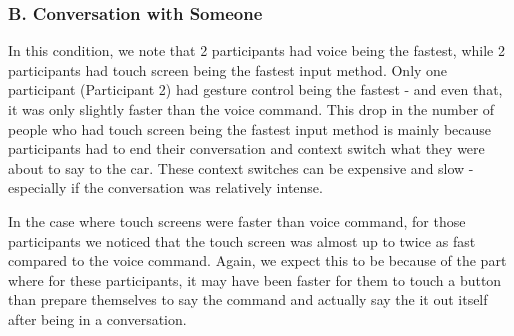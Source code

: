 \documentclass{sigchi}
\begin{document}
\subsubsection{B. Conversation with Someone}

\begin{table}[H] %
\centering
\caption{Times taken, in seconds, by each participant for each input method, when in a conversation with someone when a request to intervene was issued}
\label{table:timeConversation}
\end{table}

In this condition, we note that 2 participants had voice being the fastest, while 2 participants had touch screen being the fastest input method. Only one participant (Participant 2) had gesture control being the fastest - and even that, it was only slightly faster than the voice command. This drop in the number of people who had touch screen being the fastest input method is mainly because participants had to end their conversation and context switch what they were about to say to the car. These context switches can be expensive and slow - especially if the conversation was relatively intense. 

In the case where touch screens were faster than voice command, for those participants we noticed that the touch screen was almost up to twice as fast compared to the voice command. Again, we expect this to be because of the part where for these participants, it may have been faster for them to touch a button than prepare themselves to say the command and actually say the it out itself after being in a conversation.
\end{document}
